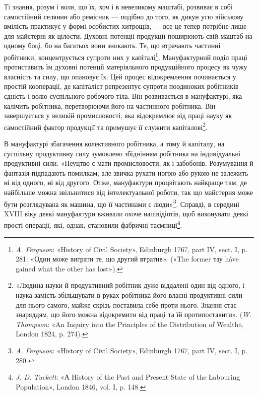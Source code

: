 Ті знання, розум і воля, що їх, хоч і в невеликому маштабі,
розвиває в собі самостійний селянин або ремісник — подібно до
того, як дикун усю військову вмілість практикує у формі особистих
хитрощів, — все це тепер потрібне лише для майстерні як цілости.
Духовні потенції продукції поширюють свій маштаб на одному
боці, бо на багатьох вони зникають. Те, що втрачають частинні
робітники, концентрується супроти них у капіталі\footnote{
\emph{A. Ferguson}: «History of Civil Society», Edinburgb 1767,
part IV, sect. I, p. 281: «Один може виграти те, що другий втратив».
(«The former тау hâve gained what the other has lost»).
}. Мануфактурний
поділ праці протиставить їм духовні потенції матеріяльного
продукційного процесу як чужу власність та силу, що опановує
їх. Цей процес відокремлення починається у простій кооперації,
де капіталіст репрезентує супроти поодиноких робітників єдність
і волю суспільного робочого тіла. Він розвивається в мануфактурі,
яка калічить робітника, перетворюючи його на частинного
робітника. Він завершується у великій промисловості, яка відокремлює
від праці науку як самостійний фактор продукції та
примушує її служити капіталові\footnote{
«Людина науки й продуктивний робітник дуже віддалені один від
одного, і наука замість збільшувати в руках робітника його власні продуктивні
сили для нього самого, майже скрізь поставила себе проти нього.
Знання стає знаряддям, що його можна відокремити від праці та їй протипоставити».
(\emph{W. Thompson}: «An Inquiry into the Principles of the
Distribution of Wealth», London 1824, p. 274).
}.

В мануфактурі збагачення колективного робітника, а тому
й капіталу, на суспільну продуктивну силу зумовлено збіднінням
робітника на індивідуальні продуктивні сили. «Неуцтво є
мати промисловости, як і забобонів. Розумування й фантазія
підпадають помилкам; але звичка рухати ногою або рукою не
залежить ні від одного, ні від другого. Отже, мануфактури процвітають
найкраще там, де найбільше можна звільнитися від
інтелектуальної роботи, так що майстерня може бути розглядувана
як машина, що її частинами є люди»\footnote{
\emph{A. Ferguson}: «History of Civil Society», Edinburgh 1767,
part IV, sect. I, p. 280.
}. Справді, в середині
XVIII віку деякі мануфактури вживали охоче напівідіотів,
щоб виконувати деякі прості операції, які, однак, становили
фабричні таємниці\footnote{
\emph{J. D. Tuckett}: «А History of the Past and Present State of
the Labouring Population», London 1846, vol. I, p. 148.
}.

